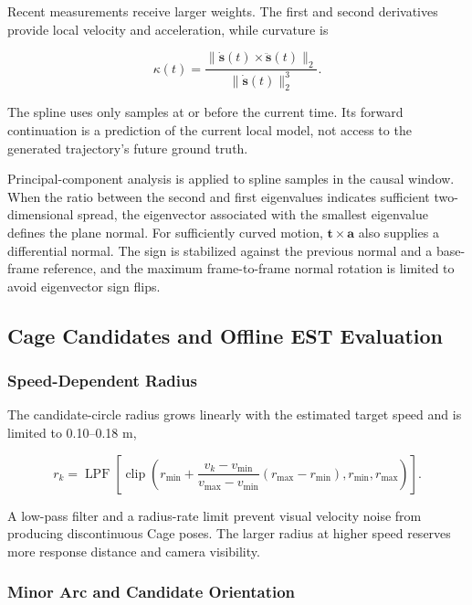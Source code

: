 \documentclass[conference]{IEEEtran}
\begin{document}
Recent measurements receive larger weights. The first and second derivatives provide local velocity and acceleration, while curvature is

\begin{equation}
\kappa(t)=\frac{\|\dot{\mathbf{s}}(t)\times\ddot{\mathbf{s}}(t)\|_2}
{\|\dot{\mathbf{s}}(t)\|_2^3}.

\end{equation}

The spline uses only samples at or before the current time. Its forward continuation is a prediction of the current local model, not access to the generated trajectory's future ground truth.

Principal-component analysis \cite{ref12} is applied to spline samples in the causal window. When the ratio between the second and first eigenvalues indicates sufficient two-dimensional spread, the eigenvector associated with the smallest eigenvalue defines the plane normal. For sufficiently curved motion, \(\mathbf{t}\times\mathbf{a}\) also supplies a differential normal. The sign is stabilized against the previous normal and a base-frame reference, and the maximum frame-to-frame normal rotation is limited to avoid eigenvector sign flips.

\subsection{Cage Candidates and Offline EST Evaluation}

\subsubsection{Speed-Dependent Radius}

The candidate-circle radius grows linearly with the estimated target speed and is limited to 0.10--0.18 m,

\begin{equation}
r_k=\operatorname{LPF}\!\left[
\operatorname{clip}\!\left(
r_{\min}+\frac{v_k-v_{\min}}{v_{\max}-v_{\min}}
(r_{\max}-r_{\min}),r_{\min},r_{\max}
\right)\right].

\end{equation}

A low-pass filter and a radius-rate limit prevent visual velocity noise from producing discontinuous Cage poses. The larger radius at higher speed reserves more response distance and camera visibility.

\subsubsection{Minor Arc and Candidate Orientation}
\end{document}
